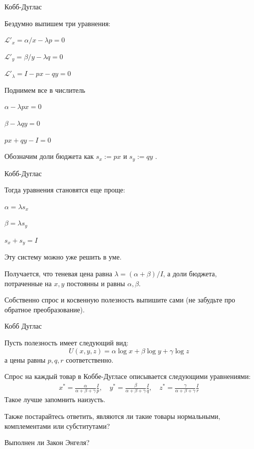 \documentclass{beamer}
\begin{document}
\begin{frame}{Кобб-Дуглас}

Бездумно выпишем три уравнения:

$\mathcal{L}'_x = \alpha/x - \lambda p = 0$

$\mathcal{L}'_y = \beta/y - \lambda q = 0$

$\mathcal{L}'_{\lambda} = I - p x - qy = 0$

Поднимем все в числитель

$\alpha - \lambda p x= 0$

$\beta - \lambda q y= 0$

$px + qy - I = 0$

Обозначим доли бюджета как $s_x := px$ и $s_y := qy$ .

\end{frame}

\begin{frame}{Кобб-Дуглас}

Тогда уравнения становятся еще проще:

$\alpha = \lambda s_x$

$\beta = \lambda s_y$

$s_x + s_y = I$

Эту систему можно уже решить в уме. 

Получается, что теневая цена равна $\lambda = (\alpha + \beta)/I$, а доли бюджета, потраченные на $x,y$ постоянны и равны $\alpha,\beta$. 

Собственно спрос и косвенную полезность выпишите сами (не забудьте про обратное преобразование). 

\end{frame}

\begin{frame}{Кобб Дуглас}

Пусть полезность имеет следующий вид:
$$U(x,y,z) = \alpha \log x + \beta \log y + \gamma \log z$$ 
а цены равны $p, q, r$ соответственно.

Спрос на каждый товар в Коббе-Дугласе описывается следующими уравнениями:
\begin{gather*}
x^{\ast} = \frac{\alpha}{\alpha + \beta + \gamma} \frac{I}{p}, \quad
y^{\ast} = \frac{\beta}{\alpha + \beta + \gamma} \frac{I}{q}, \quad
z^{\ast} = \frac{\gamma}{\alpha + \beta + \gamma} \frac{I}{r}
\end{gather*}
Такое лучше запомнить наизусть. 

Также постарайтесь ответить, являются ли такие товары нормальными, комплементами или субститутами? 

Выполнен ли Закон Энгеля?

\end{frame}
\end{document}
